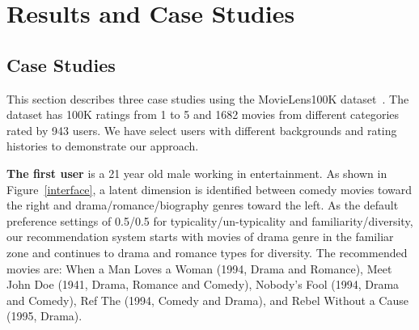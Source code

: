 \documentclass{vgtc}                          %
\begin{document}

%


\section{Results and Case Studies}

\subsection{Case Studies}

This section describes three case studies using the MovieLens100K dataset~\cite{MovieLens100k}. 
The dataset has 100K ratings from 1 to 5 and 1682 movies from different categories rated by 943 users.
We have select users with different backgrounds and rating histories to demonstrate our approach.






\textbf{The first user} is a 21 year old male working in entertainment.
As shown in Figure~\ref{interface}, a latent dimension is identified between comedy movies toward the right and drama/romance/biography genres toward the left.
As the default preference settings of 0.5/0.5 for typicality/un-typicality and familiarity/diversity, our recommendation system starts with movies of drama genre in the familiar zone and continues to drama and romance types for diversity. 
The recommended movies are: When a Man Loves a Woman (1994, Drama and Romance), Meet John Doe (1941, Drama, Romance and Comedy), Nobody’s Fool (1994, Drama and Comedy), Ref The (1994, Comedy and Drama), and Rebel Without a Cause (1995, Drama).
\end{document}
